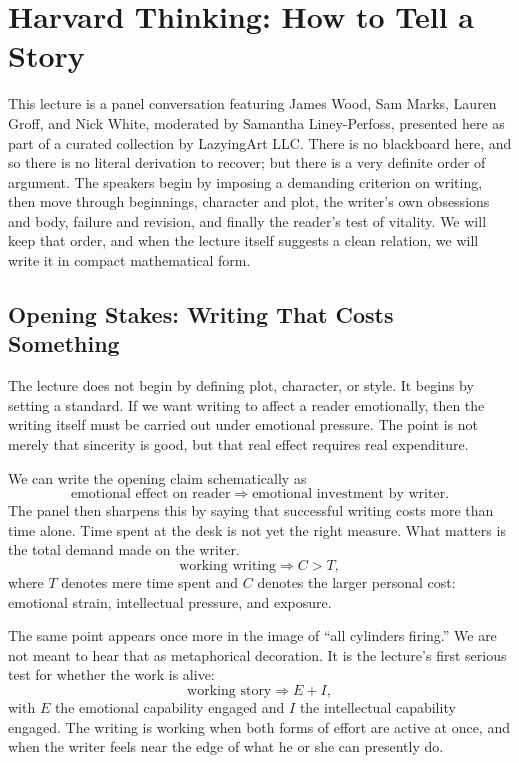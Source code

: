 \chapter{Harvard Thinking: How to Tell a Story}

This lecture is a panel conversation featuring James Wood, Sam Marks, Lauren Groff, and Nick White, moderated by Samantha Liney-Perfoss, presented here as part of a curated collection by LazyingArt LLC. There is no blackboard here, and so there is no literal derivation to recover; but there is a very definite order of argument. The speakers begin by imposing a demanding criterion on writing, then move through beginnings, character and plot, the writer's own obsessions and body, failure and revision, and finally the reader's test of vitality. We will keep that order, and when the lecture itself suggests a clean relation, we will write it in compact mathematical form.

\section{Opening Stakes: Writing That Costs Something}

The lecture does not begin by defining plot, character, or style. It begins by setting a standard. If we want writing to affect a reader emotionally, then the writing itself must be carried out under emotional pressure. The point is not merely that sincerity is good, but that real effect requires real expenditure.

We can write the opening claim schematically as
\begin{equation}
\text{emotional effect on reader} \Rightarrow \text{emotional investment by writer}.
\end{equation}
The panel then sharpens this by saying that successful writing costs more than time alone. Time spent at the desk is not yet the right measure. What matters is the total demand made on the writer.
\begin{equation}
\text{working writing} \Rightarrow C > T,
\end{equation}
where \(T\) denotes mere time spent and \(C\) denotes the larger personal cost: emotional strain, intellectual pressure, and exposure.

The same point appears once more in the image of ``all cylinders firing.'' We are not meant to hear that as metaphorical decoration. It is the lecture's first serious test for whether the work is alive:
\begin{equation}
\text{working story} \Rightarrow E + I,
\end{equation}
with \(E\) the emotional capability engaged and \(I\) the intellectual capability engaged. The writing is working when both forms of effort are active at once, and when the writer feels near the edge of what he or she can presently do.

